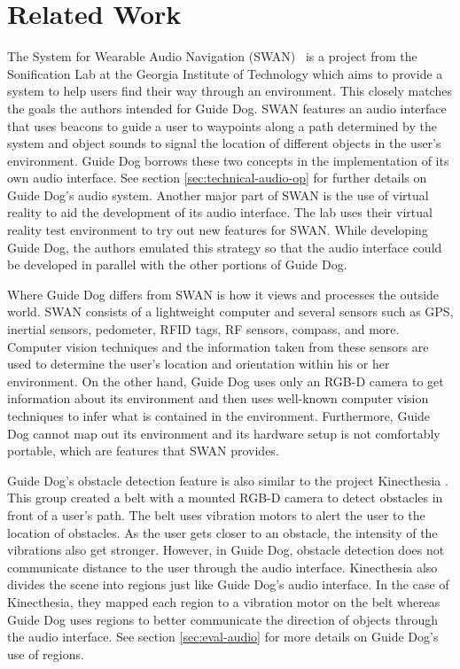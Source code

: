 \section{Related Work}
\label{sec:related}


The System for Wearable Audio Navigation (SWAN)~\cite{Walker04auditorynavigation} is a project
from the Sonification Lab at the Georgia Institute of Technology which aims to
provide a system to help users find their way through an environment. This
closely matches the goals the authors intended for Guide Dog. SWAN features an
audio interface that uses beacons to guide a user to waypoints along a path
determined by the system and object sounds to signal the location of different
objects in the user's environment. Guide Dog borrows these two concepts in the
implementation of its own audio interface. See section
\ref{sec:technical-audio-op} for further details on Guide Dog's audio system.
Another major part of SWAN is the use of virtual reality to aid the development
of its audio interface. The lab uses their virtual reality test environment to
try out new features for SWAN. While developing Guide Dog, the authors emulated
this strategy so that the audio interface could be developed in parallel with
the other portions of Guide Dog.

Where Guide Dog differs from SWAN is how it views and processes the outside
world. SWAN consists of a lightweight computer and several sensors such as GPS,
inertial sensors, pedometer, RFID tags, RF sensors, compass, and more.
Computer vision techniques and the information taken from these sensors are used to
determine the user's location and orientation within his or her environment. On
the other hand, Guide Dog uses only an RGB-D camera to get information about its
environment and then uses well-known computer vision techniques to infer what is
contained in the environment. Furthermore, Guide Dog cannot map out its
environment and its hardware setup is not comfortably portable, which are
features that SWAN provides.

Guide Dog's obstacle detection feature is also similar to the project Kinecthesia
\cite{kinecthesia-website}. This group created a belt with a mounted RGB-D
camera to detect obstacles in front of a user's path. The belt uses vibration
motors to alert the user to the location of obstacles. As the user gets closer
to an obstacle, the intensity of the vibrations also get stronger. However, in
Guide Dog, obstacle detection does not communicate distance to the user through
the audio interface. Kinecthesia also divides the
scene into regions just like Guide Dog's audio interface. In the case of
Kinecthesia, they mapped each region to a vibration motor on the belt whereas
Guide Dog uses regions to better communicate the direction of objects through
the audio interface. See section \ref{sec:eval-audio} for more details on Guide
Dog's use of regions.

